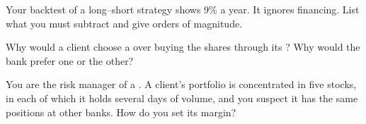 \begin{interviewq}\label{iq:m1:financing:4}
Your backtest of a long--short strategy shows 9\% a year. It ignores
financing. List what you must subtract and give orders of magnitude.
\end{interviewq}

\begin{interviewq}\label{iq:m1:financing:5}
Why would a client choose a  over buying the shares through
its ? Why would the bank prefer one or the other?
\end{interviewq}

\begin{interviewq}\label{iq:m1:financing:6}
You are the risk manager of a . A client's portfolio is
concentrated in five stocks, in each of which it holds several days of
volume, and you suspect it has the same positions at other banks. How do you
set its margin?
\end{interviewq}
